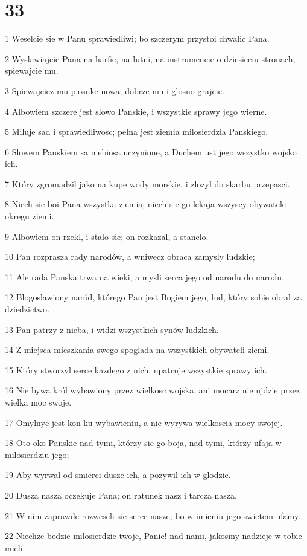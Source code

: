 \chapter{33}

\par 1 Weselcie sie w Panu sprawiedliwi; bo szczerym przystoi chwalic Pana.
\par 2 Wyslawiajcie Pana na harfie, na lutni, na instrumencie o dziesieciu stronach, spiewajcie mu.
\par 3 Spiewajciez mu piosnke nowa; dobrze mu i glosno grajcie.
\par 4 Albowiem szczere jest slowo Panskie, i wszystkie sprawy jego wierne.
\par 5 Miluje sad i sprawiedliwosc; pelna jest ziemia milosierdzia Panskiego.
\par 6 Slowem Panskiem sa niebiosa uczynione, a Duchem ust jego wszystko wojsko ich.
\par 7 Który zgromadzil jako na kupe wody morskie, i zlozyl do skarbu przepasci.
\par 8 Niech sie boi Pana wszystka ziemia; niech sie go lekaja wszyscy obywatele okregu ziemi.
\par 9 Albowiem on rzekl, i stalo sie; on rozkazal, a stanelo.
\par 10 Pan rozprasza rady narodów, a wniwecz obraca zamysly ludzkie;
\par 11 Ale rada Panska trwa na wieki, a mysli serca jego od narodu do narodu.
\par 12 Blogoslawiony naród, którego Pan jest Bogiem jego; lud, który sobie obral za dziedzictwo.
\par 13 Pan patrzy z nieba, i widzi wszystkich synów ludzkich.
\par 14 Z miejsca mieszkania swego spoglada na wszystkich obywateli ziemi.
\par 15 Który stworzyl serce kazdego z nich, upatruje wszystkie sprawy ich.
\par 16 Nie bywa król wybawiony przez wielkosc wojska, ani mocarz nie ujdzie przez wielka moc swoje.
\par 17 Omylnyc jest kon ku wybawieniu, a nie wyrywa wielkoscia mocy swojej.
\par 18 Oto oko Panskie nad tymi, którzy sie go boja, nad tymi, którzy ufaja w milosierdziu jego;
\par 19 Aby wyrwal od smierci dusze ich, a pozywil ich w glodzie.
\par 20 Dusza nasza oczekuje Pana; on ratunek nasz i tarcza nasza.
\par 21 W nim zaprawde rozweseli sie serce nasze; bo w imieniu jego swietem ufamy.
\par 22 Niechze bedzie milosierdzie twoje, Panie! nad nami, jakosmy nadzieje w tobie mieli.

